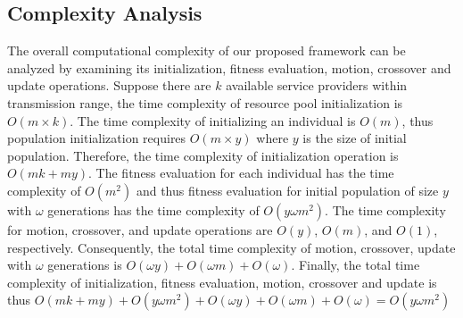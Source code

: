 \documentclass[journal]{IEEEtran}
\begin{document}
\subsection{Complexity Analysis}
The overall computational complexity of our proposed framework can be analyzed by examining its initialization, fitness evaluation, motion, crossover and update operations. 
Suppose there are $k$ available service providers within transmission range, the time complexity of resource pool initialization is $O(m \times k)$. The time complexity of initializing an individual is $O(m)$, thus population initialization requires $O(m \times y)$ where $y$ is the size of initial population. Therefore, the time complexity of initialization operation is $O(mk + my)$.
The fitness evaluation for each individual has the time complexity of $O(m^2)$ and thus fitness evaluation for initial population of size $y$ with $\omega$ generations has the time complexity of $O(y\omega m^2)$.
The time complexity for motion, crossover, and update operations are $O(y)$, $O(m)$, and $O(1)$, respectively. Consequently, the total time complexity of motion, crossover, update with $\omega$ generations is $O(\omega y) + O(\omega m) + O(\omega)$.
Finally, the total time complexity of initialization, fitness evaluation, motion, crossover and update is thus $O(mk+my) + O(y\omega m^2) + O(\omega y) + O(\omega m) + O(\omega) = O(y \omega m^2)$
\end{document}
